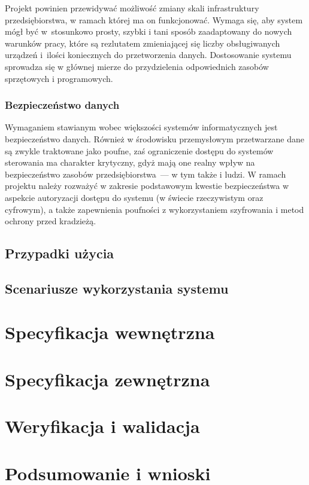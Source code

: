 \documentclass[a4paper, 12pt, twoside]{article}
\begin{document}
Projekt powinien przewidywać możliwość zmiany skali infrastruktury przedsiębiorstwa,
w ramach której ma on funkcjonować. Wymaga się, aby system mógł być
w~stosunkowo prosty, szybki i tani sposób zaadaptowany do nowych warunków pracy,
które są rezlutatem zmieniającej się liczby obsługiwanych
urządzeń i~ilości koniecznych do przetworzenia danych. Dostosowanie systemu sprowadza
się w głównej mierze do przydzielenia odpowiednich zasobów sprzętowych i programowych.

\subsubsection{Bezpieczeństwo danych}

Wymaganiem stawianym wobec większości systemów informatycznych jest bezpieczeństwo
danych. Również w środowisku przemysłowym przetwarzane dane są zwykle traktowane
jako poufne, zaś ograniczenie dostępu do systemów sterowania ma charakter krytyczny,
gdyż mają one realny wpływ na bezpieczeństwo zasobów przedsiębiorstwa~--- w tym także
i ludzi. W ramach projektu należy rozważyć w zakresie podstawowym kwestie 
bezpieczeństwa w aspekcie autoryzacji dostępu do systemu (w świecie rzeczywistym oraz
cyfrowym), a także zapewnienia poufności z wykorzystaniem szyfrowania i
metod ochrony przed kradzieżą.

\subsection{Przypadki użycia}

\subsection{Scenariusze wykorzystania systemu}

\section{Specyfikacja wewnętrzna}\label{spec-zew}

\section{Specyfikacja zewnętrzna}\label{spec-wew}

\section{Weryfikacja i walidacja}\label{testy}

\section{Podsumowanie i wnioski}\label{wnioski}

\printbibliography
\end{document}
